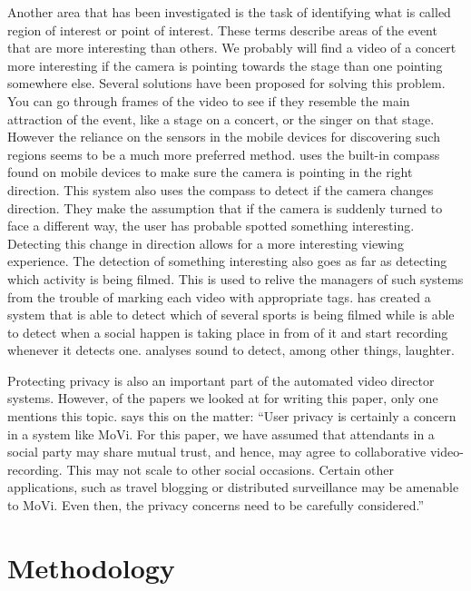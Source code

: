 \documentclass[conference]{IEEEtran}
\begin{document}
Another area that has been investigated is the task of identifying what is called region of interest or point of interest. These terms describe areas of the event that are more interesting than others. We probably will find a video of a concert more interesting if the camera is pointing towards the stage than one pointing somewhere else. Several solutions have been proposed for solving this problem. You can go through frames of the video to see if they resemble the main attraction of the event, like a stage on a concert, or the singer on that stage. However the reliance on the sensors in the mobile devices for discovering such regions seems to be a much more preferred method. \cite{cricri_sensor-based_2012}uses the built-in compass found on mobile devices to make sure the camera is pointing in the right direction. This system also uses the compass to detect if the camera changes direction. They make the assumption that if the camera is suddenly turned to face a different way, the user has probable spotted something interesting. Detecting this change in direction allows for a more interesting viewing experience. 
The detection of something interesting also goes as far as detecting which activity is being filmed.  This is used to relive the managers of such systems from the trouble of marking each video with appropriate tags. \cite{cricri_sport_2014}has created a system that is able to detect which of several sports is being filmed while \cite{bao_movi:_2010} is able to detect when a social happen is taking place in from of it and start recording whenever it detects one. \cite{bao_movi:_2010} analyses sound to detect, among other things, laughter. 

Protecting privacy is also an important part of the automated video director systems. However, of the papers we looked at for writing this paper, only one mentions this topic. \cite{bao_movi:_2010} says this on the matter:
“User privacy is certainly a concern in a system like MoVi. For this paper, we have assumed that attendants in a social party may share mutual trust, and hence, may agree to collaborative video-recording. This may not scale to other social occasions. Certain other applications, such as travel blogging or distributed surveillance may be amenable to MoVi. Even then, the privacy concerns need to be carefully considered.”

\section{Methodology}
\end{document}
